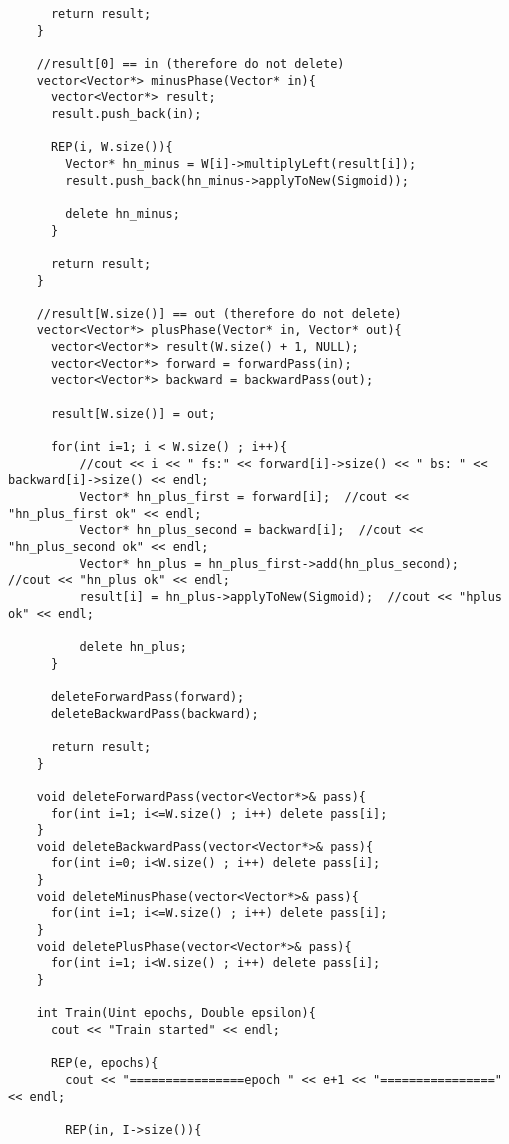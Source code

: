 \begin{lstlisting}
      return result; 
    }
    
    //result[0] == in (therefore do not delete) 
    vector<Vector*> minusPhase(Vector* in){
      vector<Vector*> result; 
      result.push_back(in); 
      
      REP(i, W.size()){
        Vector* hn_minus = W[i]->multiplyLeft(result[i]); 
        result.push_back(hn_minus->applyToNew(Sigmoid));
        
        delete hn_minus; 
      }
      
      return result;
    }
    
    //result[W.size()] == out (therefore do not delete) 
    vector<Vector*> plusPhase(Vector* in, Vector* out){
      vector<Vector*> result(W.size() + 1, NULL);
      vector<Vector*> forward = forwardPass(in); 
      vector<Vector*> backward = backwardPass(out); 
      
      result[W.size()] = out; 
      
      for(int i=1; i < W.size() ; i++){
          //cout << i << " fs:" << forward[i]->size() << " bs: " << backward[i]->size() << endl; 
          Vector* hn_plus_first = forward[i];  //cout << "hn_plus_first ok" << endl; 
          Vector* hn_plus_second = backward[i];  //cout << "hn_plus_second ok" << endl; 
          Vector* hn_plus = hn_plus_first->add(hn_plus_second);  //cout << "hn_plus ok" << endl; 
          result[i] = hn_plus->applyToNew(Sigmoid);  //cout << "hplus ok" << endl; 
          
          delete hn_plus; 
      }
      
      deleteForwardPass(forward);
      deleteBackwardPass(backward); 
      
      return result; 
    }
    
    void deleteForwardPass(vector<Vector*>& pass){
      for(int i=1; i<=W.size() ; i++) delete pass[i];
    }
    void deleteBackwardPass(vector<Vector*>& pass){
      for(int i=0; i<W.size() ; i++) delete pass[i];
    }
    void deleteMinusPhase(vector<Vector*>& pass){
      for(int i=1; i<=W.size() ; i++) delete pass[i];
    }
    void deletePlusPhase(vector<Vector*>& pass){
      for(int i=1; i<W.size() ; i++) delete pass[i];
    }
    
    int Train(Uint epochs, Double epsilon){
      cout << "Train started" << endl;
        
      REP(e, epochs){
        cout << "================epoch " << e+1 << "================" << endl;
      
        REP(in, I->size()){ 
        

\end{lstlisting}
